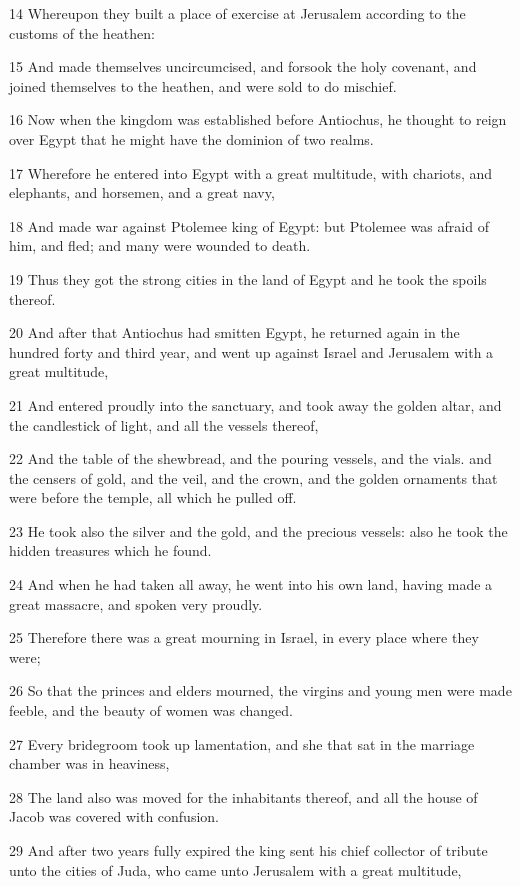 \par 14 Whereupon they built a place of exercise at Jerusalem according to the customs of the heathen:
\par 15 And made themselves uncircumcised, and forsook the holy covenant, and joined themselves to the heathen, and were sold to do mischief.
\par 16 Now when the kingdom was established before Antiochus, he thought to reign over Egypt that he might have the dominion of two realms.
\par 17 Wherefore he entered into Egypt with a great multitude, with chariots, and elephants, and horsemen, and a great navy,
\par 18 And made war against Ptolemee king of Egypt: but Ptolemee was afraid of him, and fled; and many were wounded to death.
\par 19 Thus they got the strong cities in the land of Egypt and he took the spoils thereof.
\par 20 And after that Antiochus had smitten Egypt, he returned again in the hundred forty and third year, and went up against Israel and Jerusalem with a great multitude,
\par 21 And entered proudly into the sanctuary, and took away the golden altar, and the candlestick of light, and all the vessels thereof,
\par 22 And the table of the shewbread, and the pouring vessels, and the vials. and the censers of gold, and the veil, and the crown, and the golden ornaments that were before the temple, all which he pulled off.
\par 23 He took also the silver and the gold, and the precious vessels: also he took the hidden treasures which he found.
\par 24 And when he had taken all away, he went into his own land, having made a great massacre, and spoken very proudly.
\par 25 Therefore there was a great mourning in Israel, in every place where they were;
\par 26 So that the princes and elders mourned, the virgins and young men were made feeble, and the beauty of women was changed.
\par 27 Every bridegroom took up lamentation, and she that sat in the marriage chamber was in heaviness,
\par 28 The land also was moved for the inhabitants thereof, and all the house of Jacob was covered with confusion.
\par 29 And after two years fully expired the king sent his chief collector of tribute unto the cities of Juda, who came unto Jerusalem with a great multitude,
